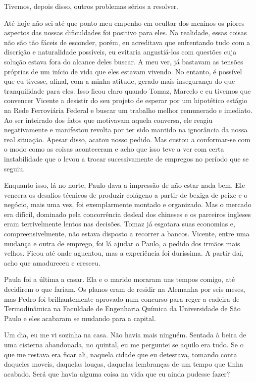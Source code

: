 Tivemos, depois disso, outros problemas sérios a resolver.


Até hoje não sei até que ponto meu empenho em ocultar dos meninos os piores aspectos das nossas dificuldades foi positivo para eles.
Na realidade, essas coisas não são tão fáceis de esconder, porém, eu acreditava que enfrentando tudo com a discrição e naturalidade possíveis, eu evitaria angustiá-los com questões cuja solução estava fora do alcance deles buscar.
A meu ver, já bastavam as tensões próprias de um início de vida que eles estavam vivendo.
No entanto, é possível que eu tivesse, afinal, com a minha atitude, gerado mais insegurança do que tranquilidade para eles.
Isso ficou claro quando Tomaz, Marcelo e eu tivemos que convencer Vicente a desistir do seu projeto de esperar por um hipotético estágio na Rede Ferroviária Federal e buscar um trabalho melhor remunerado e imediato.
Ao ser inteirado dos fatos que motivavam aquela conversa, ele reagiu negativamente e manifestou revolta por ter sido mantido na ignorância da nossa real situação.
Apesar disso, acatou nosso pedido.
Mas custou a conformar-se com o modo como as coisas aconteceram e acho que isso teve a ver com certa instabilidade que o levou a trocar sucessivamente de empregos no período que se seguiu.

Enquanto isso, lá no norte, Paulo dava a impressão de não estar nada bem.
Ele vencera os desafios técnicos de produzir colágeno a partir de bexiga de peixe e o negócio, mais uma vez, foi exemplarmente montado e organizado.
Mas o mercado era difícil, dominado pela concorrência desleal dos chineses e os parceiros ingleses eram terrivelmente lentos nas decisões.
Tomaz já esgotara suas economias e, compreensivelmente, não estava disposto a recorrer a bancos.
Vicente, entre uma mudança e outra de emprego, foi lá ajudar o Paulo, a pedido dos irmãos mais velhos.
Ficou até onde aguentou, mas a experiência foi duríssima.
A partir daí, acho que amadureceu e cresceu.

Paula foi a última a casar.
Ela e o marido moraram uns tempos comigo, até decidirem o que fariam.
Os planos eram de residir na Alemanha por seis meses, mas Pedro foi brilhantemente aprovado num concurso para reger a cadeira de Termodinâmica na Faculdade de Engenharia Química da Universidade de São Paulo e eles acabaram se mudando para a capital.

Um dia, eu me vi sozinha na casa.
Não havia mais ninguém.
Sentada à beira de uma cisterna abandonada, no quintal, eu me perguntei se aquilo era tudo.
Se o que me restava era ficar ali, naquela cidade que eu detestava, tomando conta daqueles moveis, daquelas louças, daquelas lembranças de um tempo que tinha acabado.
Será que havia alguma coisa na vida que eu ainda pudesse fazer?


